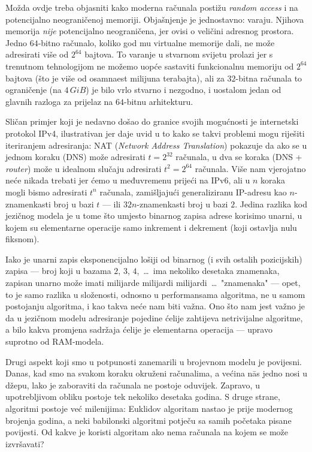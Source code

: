 Možda ovdje treba objasniti kako moderna računala postižu \emph{random access} i na potencijalno neograničenoj memoriji. Objašnjenje je jednostavno: varaju. Njihova memorija \emph{nije} potencijalno neograničena, jer ovisi o veličini adresnog prostora. Jedno $64$-bitno računalo, koliko god mu virtualne memorije dali, ne može adresirati više od $2^{64}$ bajtova. To varanje u stvarnom svijetu prolazi jer s trenutnom tehnologijom ne možemo uopće sastaviti funkcionalnu memoriju od $2^{64}$ bajtova (što je više od osamnaest milijuna terabajta), ali za $32$-bitna računala to ograničenje (na $4\,GiB$) je bilo vrlo stvarno i nezgodno, i uostalom jedan od glavnih razloga za prijelaz na $64$-bitnu arhitekturu.

Sličan primjer koji je nedavno došao do granice svojih mogućnosti je internetski protokol IPv4, ilustrativan jer daje uvid u to kako se takvi problemi mogu riješiti iteriranjem adresiranja: NAT (\emph{Network Address Translation}) pokazuje da ako se u jednom koraku (DNS) može adresirati $t=2^{32}$ računala, u dva se koraka (DNS + \emph{router}) može u idealnom slučaju adresirati $t^2=2^{64}$ računala. Više nam vjerojatno neće nikada trebati jer ćemo u međuvremenu prijeći na IPv6, ali u $n$ koraka mogli bismo adresirati $t^n$ računala, zamišljajući generaliziranu IP-adresu kao $n$-znamenkasti broj u bazi $t$ --- ili $32n$-znamenkasti broj u bazi $2$. Jedina razlika kod jezičnog modela je u tome što umjesto binarnog zapisa adrese korisimo unarni, u kojem su elementarne operacije samo inkrement i dekrement (koji ostavlja nulu fiksnom).

Iako je unarni zapis eksponencijalno lošiji od binarnog (i svih ostalih pozicijskih) zapisa --- broj koji u bazama $2$, $3$, $4$,~\ldots\ ima nekoliko desetaka znamenaka, zapisan unarno može imati milijarde milijardi milijardi~\ldots\ "znamenaka" --- opet, to je samo razlika u složenosti, odnosno u performansama algoritma, ne u samom postojanju algoritma, i kao takva neće nam biti važna. Ono što nam jest važno je da u jezičnom modelu adresiranje pojedine ćelije zahtijeva netrivijalne algoritme, a bilo kakva promjena sadržaja ćelije je elementarna operacija --- upravo suprotno od RAM-modela.


Drugi aspekt koji smo u potpunosti zanemarili u brojevnom modelu je povijesni. Danas, kad smo na svakom koraku okruženi računalima, a većina n\=as jedno nosi u džepu, lako je zaboraviti da računala ne postoje oduvijek. Zapravo, u upotrebljivom obliku postoje tek nekoliko desetaka godina. S druge strane, algoritmi postoje već milenijima: Euklidov algoritam nastao je prije modernog brojenja godina, a neki babilonski algoritmi potječu sa samih početaka pisane povijesti. Od kakve je koristi algoritam ako nema računala na kojem se može izvršavati?

